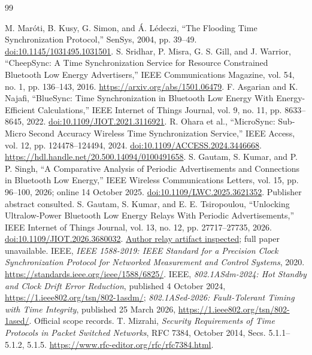 \documentclass[11pt,letterpaper]{article}
\begin{document}
\begin{thebibliography}{99}\small\raggedright
{} M. Mar\'oti, B. Kusy, G. Simon, and \'A. L\'edeczi, ``The Flooding Time Synchronization Protocol,'' SenSys, 2004, pp. 39--49. \href{https://doi.org/10.1145/1031495.1031501}{doi:10.1145/1031495.1031501}.
 S. Sridhar, P. Misra, G. S. Gill, and J. Warrior, ``CheepSync: A Time Synchronization Service for Resource Constrained Bluetooth Low Energy Advertisers,'' IEEE Communications Magazine, vol. 54, no. 1, pp. 136--143, 2016. \url{https://arxiv.org/abs/1501.06479}.
 F. Asgarian and K. Najafi, ``BlueSync: Time Synchronization in Bluetooth Low Energy With Energy-Efficient Calculations,'' IEEE Internet of Things Journal, vol. 9, no. 11, pp. 8633--8645, 2022. \href{https://doi.org/10.1109/JIOT.2021.3116921}{doi:10.1109/JIOT.2021.3116921}.
 R. Ohara et al., ``MicroSync: Sub-Micro Second Accuracy Wireless Time Synchronization Service,'' IEEE Access, vol. 12, pp. 124478--124494, 2024. \href{https://doi.org/10.1109/ACCESS.2024.3446668}{doi:10.1109/ACCESS.2024.3446668}. \url{https://hdl.handle.net/20.500.14094/0100491658}.
 S. Gautam, S. Kumar, and P. P. Singh, ``A Comparative Analysis of Periodic Advertisements and Connections in Bluetooth Low Energy,'' IEEE Wireless Communications Letters, vol. 15, pp. 96--100, 2026; online 14 October 2025. \href{https://doi.org/10.1109/LWC.2025.3621352}{doi:10.1109/LWC.2025.3621352}. Publisher abstract consulted.
 S. Gautam, S. Kumar, and E. E. Tsiropoulou, ``Unlocking Ultralow-Power Bluetooth Low Energy Relays With Periodic Advertisements,'' IEEE Internet of Things Journal, vol. 13, no. 12, pp. 27717--27735, 2026. \href{https://doi.org/10.1109/JIOT.2026.3680032}{doi:10.1109/JIOT.2026.3680032}. \href{https://github.com/sukgautamgit/DPCS-SimultaneousTx-Rx-BLE-Demo}{Author relay artifact inspected}; full paper unavailable.
 IEEE, \emph{IEEE 1588-2019: IEEE Standard for a Precision Clock Synchronization Protocol for Networked Measurement and Control Systems}, 2020. \url{https://standards.ieee.org/ieee/1588/6825/}.
 IEEE, \emph{802.1ASdm-2024: Hot Standby and Clock Drift Error Reduction}, published 4 October 2024, \url{https://1.ieee802.org/tsn/802-1asdm/}; \emph{802.1ASed-2026: Fault-Tolerant Timing with Time Integrity}, published 25 March 2026, \url{https://1.ieee802.org/tsn/802-1ased/}. Official scope records.
 T. Mizrahi, \emph{Security Requirements of Time Protocols in Packet Switched Networks}, RFC 7384, October 2014, Secs. 5.1.1--5.1.2, 5.1.5. \url{https://www.rfc-editor.org/rfc/rfc7384.html}.

\end{thebibliography}
\end{document}
